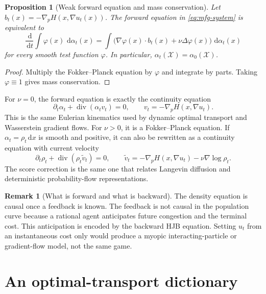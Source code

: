 \documentclass[11pt,a4paper]{article}
\newtheorem{proposition}[theorem]{Proposition}
\theoremstyle{definition}
\newtheorem{remark}[theorem]{Remark}
\newcommand{\diverg}{\operatorname{div}}
\newcommand{\dd}{\,\mathrm d}
\newcommand{\al}{\alpha}
\begin{document}
\begin{proposition}[Weak forward equation and mass conservation]
\label{prop:mfg-weak-fp}
Let $b_t(x)=-\nabla_pH(x,\nabla u_t(x))$.  The forward equation in
\eqref{eq:mfg-system} is equivalent to
\begin{equation}\label{eq:mfg-weak-fp}
  \frac{\dd}{\dd t}\int\varphi(x)\,\dd\al_t(x)
  =\int\bigl(\nabla\varphi(x)\cdot b_t(x)
      +\nu\Delta\varphi(x)\bigr)\,\dd\al_t(x)
\end{equation}
for every smooth test function $\varphi$.  In particular,
$\al_t(\mathcal X)=\al_0(\mathcal X)$.
\end{proposition}

\begin{proof}
Multiply the Fokker--Planck equation by $\varphi$ and integrate by parts.
Taking $\varphi\equiv1$ gives mass conservation.
\end{proof}

For $\nu=0$, the forward equation is exactly the continuity equation
\begin{equation}\label{eq:mfg-continuity}
  \partial_t\al_t+\diverg(\al_tv_t)=0,
  \qquad
  v_t=-\nabla_pH(x,\nabla u_t).
\end{equation}
This is the same Eulerian kinematics used by dynamic optimal transport and
Wasserstein gradient flows.  For $\nu>0$, it is a Fokker--Planck equation.
If $\al_t=\rho_t\dd x$ is smooth and positive, it can also be rewritten as a
continuity equation with current velocity
\begin{equation}\label{eq:mfg-current-velocity}
  \partial_t\rho_t+\diverg(\rho_t\widetilde v_t)=0,
  \qquad
  \widetilde v_t=-\nabla_pH(x,\nabla u_t)-\nu\nabla\log\rho_t.
\end{equation}
The score correction is the same one that relates Langevin diffusion and
deterministic probability-flow representations.

\begin{remark}[What is forward and what is backward]
The density equation is causal once a feedback is known.  The feedback is not
causal in the population curve because a rational agent anticipates future
congestion and the terminal cost.  This anticipation is encoded by the
backward HJB equation.  Setting $u_t$ from an instantaneous cost only would
produce a myopic interacting-particle or gradient-flow model, not the same
game.
\end{remark}

\section{An optimal-transport dictionary}
\end{document}
